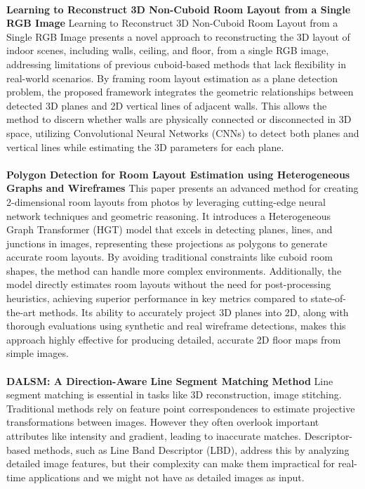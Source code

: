 \paragraph{}

\textbf{Learning to Reconstruct 3D Non-Cuboid Room Layout from a Single RGB Image} Learning to Reconstruct 3D Non-Cuboid Room Layout from a Single RGB Image\cite{9707088} presents a novel approach to reconstructing the 3D layout of indoor scenes, including walls, ceiling, and floor, from a single RGB image, addressing limitations of previous cuboid-based methods that lack flexibility in real-world scenarios. By framing room layout estimation as a plane detection problem, the proposed framework integrates the geometric relationships between detected 3D planes and 2D vertical lines of adjacent walls. This allows the method to discern whether walls are physically connected or disconnected in 3D space, utilizing Convolutional Neural Networks (CNNs) to detect both planes and vertical lines while estimating the 3D parameters for each plane.

\paragraph{}

\textbf{Polygon Detection for Room Layout Estimation using Heterogeneous Graphs and Wireframes}
This paper \cite{10350607} presents an advanced method for creating 2-dimensional room layouts from photos by leveraging cutting-edge neural network techniques and geometric reasoning. It introduces a Heterogeneous Graph Transformer (HGT) model that excels in detecting planes, lines, and junctions in images, representing these projections as polygons to generate accurate room layouts. By avoiding traditional constraints like cuboid room shapes, the method can handle more complex environments. Additionally, the model directly estimates room layouts without the need for post-processing heuristics, achieving superior performance in key metrics compared to state-of-the-art methods. Its ability to accurately project 3D planes into 2D, along with thorough evaluations using synthetic and real wireframe detections, makes this approach highly effective for producing detailed, accurate 2D floor maps from simple images.

\paragraph{}

\textbf{DALSM: A Direction-Aware Line Segment Matching Method}
Line segment matching is essential in tasks like 3D reconstruction, image stitching. Traditional methods rely on feature point correspondences to estimate projective transformations between images. However they often overlook important attributes like intensity and gradient, leading to inaccurate matches. Descriptor-based methods, such as Line Band Descriptor (LBD), address this by analyzing detailed image features, but their complexity can make them impractical for real-time applications and we might not have as detailed images as input.

